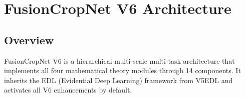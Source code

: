 \section{FusionCropNet V6 Architecture}

\subsection{Overview}

FusionCropNet V6 is a hierarchical multi-scale multi-task architecture that
implements all four mathematical theory modules through 14 components. It
inherits the EDL (Evidential Deep Learning) framework from V5EDL and activates
all V6 enhancements by default.

